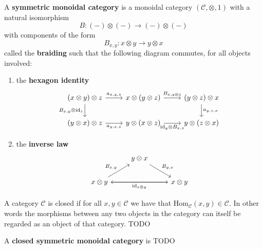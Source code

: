 \begin{definition}
  A \textbf{symmetric monoidal category} is a monoidal category $ (\mathcal{C}, \otimes, 1) $ with a natural isomorphism
  \begin{equation}
    B: (-) \otimes (-) \to (-) \otimes (-)
    \label{eq:braiding}
  \end{equation}
  with components of the form
  \begin{equation}
    B_{x,y}: x \otimes y \to y \otimes x
  \end{equation}
  called the \textbf{braiding} such that the following diagram commutes, for all objects involved:
  \begin{enumerate}[label=(\roman*)]
    \item the \textbf{hexagon identity}
      \[\begin{tikzcd}
	      {(x \otimes y) \otimes z} & {x\otimes (y\otimes z)} & {(y\otimes z) \otimes x} \\
	      {(y\otimes x)\otimes z} & {y \otimes (x\otimes z)} & {y \otimes (z \otimes x)}
	      \arrow["{B_{x,y}\otimes\text{id}_z}"', from=1-1, to=2-1]
	      \arrow["{a_{x,y,z}}", from=1-1, to=1-2]
	      \arrow["{B_{x,y\otimes z}}", from=1-2, to=1-3]
	      \arrow["{a_{y,z,x}}", from=1-3, to=2-3]
	      \arrow["{a_{y,x,z}}"', from=2-1, to=2-2]
	      \arrow["{\text{id}_y \otimes B_{x,z}}"', from=2-2, to=2-3]
      \end{tikzcd}\]
    \item the \textbf{inverse law}
      \[\begin{tikzcd}
	& {y\otimes x} \\
	      {x\otimes y} && {x\otimes y}
	      \arrow["{B_{x,y}}", from=2-1, to=1-2]
	      \arrow["{B_{y,x}}", from=1-2, to=2-3]
	      \arrow[from=2-1, to=2-3]
	      \arrow["{\text{id}_{x\otimes y}}", from=2-3, to=2-1]
      \end{tikzcd}\]
  \end{enumerate}
\end{definition}

\begin{definition}
  A category $ \mathcal{C} $ is closed if for all $ x,y \in \mathcal{C} $ we have that $ \text{Hom}_{\mathcal{C}}(x,y) \in \mathcal{C} $. In other words the morphisms between any two objects in the category can itself be regarded as an object of that category. TODO
\end{definition}

\begin{definition}
  A \textbf{closed symmetric monoidal category} is TODO
\end{definition}

